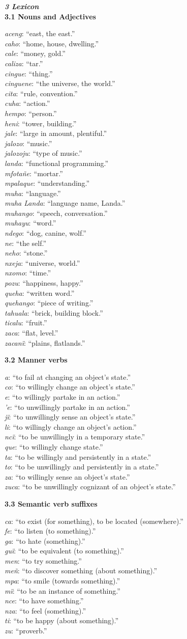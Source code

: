 \documentclass{article}[10pt]
\newcommand{\define}[2]{\emph{#1}: ``#2.'' \\}
\begin{document}
\clearpage
{\bf \emph{3 Lexicon}}\\

{\bf 3.1 Nouns and Adjectives}
\begin{multicols}{3}
\noindent
\define{aceng}{east, the east}
\define{caho}{home, house, dwelling}
\define{cale}{money, gold}
\define{caliza}{tar}
\define{cingue}{thing}
\define{cinguene}{the universe, the world}
\define{cita}{rule, convention}
\define{cuha}{action}
\define{hempo}{person}
\define{heni}{tower, building}
\define{jale}{large in amount, plentiful}
\define{jalozo}{music}
\define{jalozoju}{type of music}
\define{landa}{functional programming}
\define{mfota\~{n}e}{mortar}
\define{mpalaque}{understanding}
\define{muha}{language}
\define{muha Landa}{language name, Landa}
\define{muhango}{speech, conversation}
\define{muhayu}{word}
\define{ndego}{dog, canine, wolf}
\define{ne}{the self}
\define{neho}{stone}
\define{nxeja}{universe, world}
\define{nxomo}{time}
\define{pozu}{happiness, happy}
\define{queha}{written word}
\define{quehango}{piece of writing}
\define{tahuala}{brick, building block}
\define{ticalu}{fruit}
\define{zaca}{flat, level}
\define{zacan\"{i}}{plains, flatlands}
\end{multicols}

{\bf 3.2 Manner verbs}
\begin{multicols}{3}
\noindent
\define{a}{to fail at changing an object's state}
\define{co}{to willingly change an object's state}
\define{e}{to willingly partake in an action}
\define{'e}{to unwillingly partake in an action}
\define{j\"{i}}{to unwillingly sense an object's state}
\define{li}{to willingly change an object's action}
\define{nc\"{i}}{to be unwillingly in a temporary state}
\define{que}{to willingly change state}
\define{ta}{to be willingly and persistently in a state}
\define{to}{to be unwillingly and persistently in a state}
\define{za}{to willingly sense an object's state}
\define{zuca}{to be unwillingly cognizant of an object's state}
\end{multicols}

{\bf 3.3 Semantic verb suffixes}
\begin{multicols}{3}
\noindent
\define{ca}{to exist (for something), to be located (somewhere)}
\define{fe}{to listen (to something)}
\define{ga}{to hate (something)}
\define{gu\"{i}}{to be equivalent (to something)}
\define{men}{to try something}
\define{me\~{n}}{to discover something (about something)}
\define{mpa}{to smile (towards something)}
\define{m\"{i}}{to be an instance of something}
\define{nce}{to have something}
\define{nza}{to feel (something)}
\define{ti}{to be happy (about something)}
\define{zu}{proverb}
\end{multicols}
\end{document}

